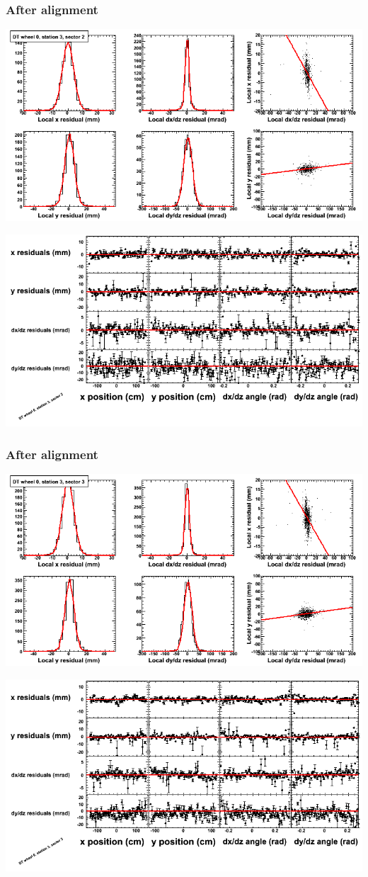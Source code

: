 \documentclass[compress]{beamer}
\begin{document}
\begin{frame}
\frametitle{After alignment}
\includegraphics[width=0.7\linewidth]{NOV4_fitfunctions/MBwhCst3sec02_bellcurves.png}

\includegraphics[width=0.7\linewidth]{NOV4_fitfunctions/MBwhCst3sec02_polynomials.png}
\end{frame}

\begin{frame}
\frametitle{After alignment}
\includegraphics[width=0.7\linewidth]{NOV4_fitfunctions/MBwhCst3sec03_bellcurves.png}

\includegraphics[width=0.7\linewidth]{NOV4_fitfunctions/MBwhCst3sec03_polynomials.png}
\end{frame}
\end{document}

